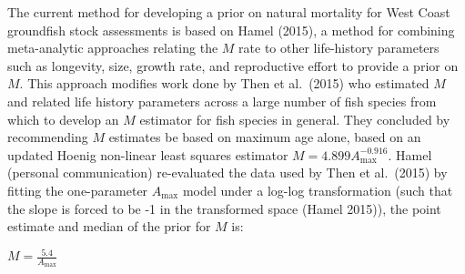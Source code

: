 \documentclass[11pt,
  english,
  a4paper,
]{article}
\begin{document}
\leavevmode\tagmcend\tagstructend


The current method for developing a prior on natural mortality for West Coast groundfish stock assessments is based on Hamel {(2015)\leavevmode\tagmcend\tagstructend}, a method for combining meta-analytic approaches relating the {\(M\)\leavevmode\tagmcend\tagstructend} rate to other life-history parameters such as longevity, size, growth rate, and reproductive effort to provide a prior on {\(M\)\leavevmode\tagmcend\tagstructend}. This approach modifies work done by Then et al.~{(2015)\leavevmode\tagmcend\tagstructend} who estimated {\(M\)\leavevmode\tagmcend\tagstructend} and related life history parameters across a large number of fish species from which to develop an {\(M\)\leavevmode\tagmcend\tagstructend} estimator for fish species in general. They concluded by recommending {\(M\)\leavevmode\tagmcend\tagstructend} estimates be based on maximum age alone, based on an updated Hoenig non-linear least squares estimator {\(M = 4.899A^{-0.916}_{\text{max}}\)\leavevmode\tagmcend\tagstructend}. Hamel (personal communication) re-evaluated the data used by Then et al.~{(2015)\leavevmode\tagmcend\tagstructend} by fitting the one-parameter {\(A_{\text{max}}\)\leavevmode\tagmcend\tagstructend} model under a log-log transformation (such that the slope is forced to be -1 in the transformed space {(Hamel 2015)\leavevmode\tagmcend\tagstructend}), the point estimate and median of the prior for {\(M\)\leavevmode\tagmcend\tagstructend} is:

\leavevmode\tagmcend\tagstructend\par

\begin{centering}

$M=\frac{5.4}{A_{\text{max}}}$

\end{centering}
\end{document}
